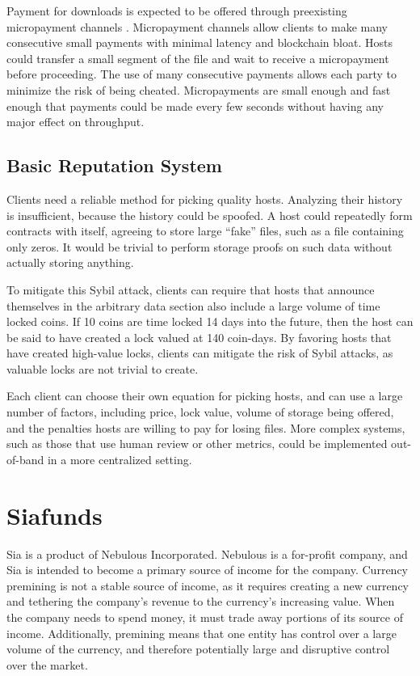 \documentclass[twocolumn]{article}
\begin{document}
Payment for downloads is expected to be offered through preexisting micropayment channels \cite{mpc}.
Micropayment channels allow clients to make many consecutive small payments with minimal latency and blockchain bloat.
Hosts could transfer a small segment of the file and wait to receive a micropayment before proceeding.
The use of many consecutive payments allows each party to minimize the risk of being cheated.
Micropayments are small enough and fast enough that payments could be made every few seconds without having any major effect on throughput.

\subsection{Basic Reputation System}
Clients need a reliable method for picking quality hosts.
Analyzing their history is insufficient, because the history could be spoofed.
A host could repeatedly form contracts with itself, agreeing to store large ``fake'' files, such as a file containing only zeros.
It would be trivial to perform storage proofs on such data without actually storing anything.

To mitigate this Sybil attack, clients can require that hosts that announce themselves in the arbitrary data section also include a large volume of time locked coins.
If 10 coins are time locked 14 days into the future, then the host can be said to have created a lock valued at 140 coin-days.
By favoring hosts that have created high-value locks, clients can mitigate the risk of Sybil attacks, as valuable locks are not trivial to create.

Each client can choose their own equation for picking hosts, and can use a large number of factors, including price, lock value, volume of storage being offered, and the penalties hosts are willing to pay for losing files.
More complex systems, such as those that use human review or other metrics, could be implemented out-of-band in a more centralized setting.

\section{Siafunds}
Sia is a product of Nebulous Incorporated.
Nebulous is a for-profit company, and Sia is intended to become a primary source of income for the company.
Currency premining is not a stable source of income, as it requires creating a new currency and tethering the company's revenue to the currency's increasing value.
When the company needs to spend money, it must trade away portions of its source of income.
Additionally, premining means that one entity has control over a large volume of the currency, and therefore potentially large and disruptive control over the market.
\end{document}
